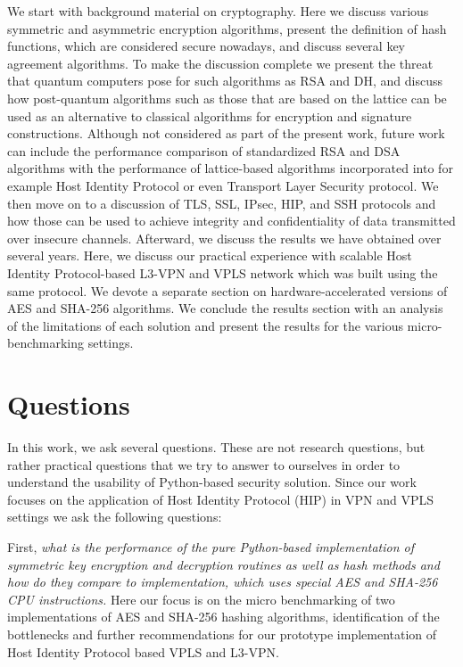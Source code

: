 We start with background material on cryptography. 
Here we discuss various symmetric and asymmetric encryption algorithms, 
present the definition of hash functions, which are considered secure nowadays, 
and discuss several key agreement algorithms. To make the discussion 
complete we present the threat that quantum computers pose for such 
algorithms as RSA and DH, and discuss how post-quantum algorithms such 
as those that are based on the lattice can be used as an alternative to classical 
algorithms for encryption and signature constructions. Although not considered 
as part of the present work, future work can include the performance 
comparison of standardized RSA and DSA algorithms with the performance of 
lattice-based algorithms incorporated into for example Host Identity Protocol 
or even Transport Layer Security protocol. We then move on to a discussion of 
TLS, SSL, IPsec, HIP, and SSH protocols and how those can be used to achieve 
integrity and confidentiality of data transmitted over insecure channels. 
Afterward, we discuss the results we have obtained 
over several years. Here, we discuss our practical experience 
with scalable Host Identity Protocol-based L3-VPN and VPLS network which was 
built using the same protocol. We devote a separate section on 
hardware-accelerated versions of AES and SHA-256 algorithms. We conclude 
the results section with an analysis of the limitations of each solution 
and present the results for the various micro-benchmarking settings.

\section{Questions}

In this work, we ask several questions. These are not research questions, 
but rather practical questions that we try to answer to ourselves in order to 
understand the usability of Python-based security solution. Since our work 
focuses on the application of Host Identity Protocol (HIP) in VPN and VPLS 
settings we ask the following questions:

First, {\it what is the performance of the pure Python-based implementation of 
symmetric key encryption and decryption routines as well as hash methods and 
how do they compare to implementation, which uses special AES and SHA-256 CPU 
instructions.} Here our focus is on the micro benchmarking of two implementations 
of AES and SHA-256 hashing algorithms, identification of the bottlenecks and 
further recommendations for our prototype implementation of Host Identity Protocol 
based VPLS and L3-VPN.

